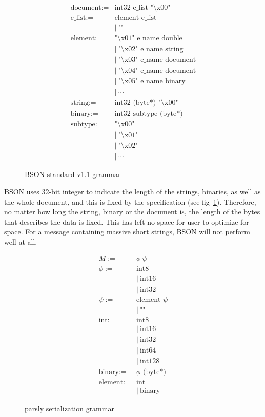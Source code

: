 \documentclass{article}
\begin{document}
\begin{figure}[h!]
\label{eq:bsonGrammar}
\begin{align*}
\text{document} :=&  \text{int32 e\_list "\textbackslash x00" } \\
\text{e\_list} :=& \text{element e\_list} \\
&| \ \text{""} \\
\text{element}	:=& \text{"\textbackslash x01" e\_name double} \\
&| \ \text{"\textbackslash x02" e\_name string} \\
&| \ \text{"\textbackslash x03" e\_name document} \\
&| \ \text{"\textbackslash x04" e\_name document} \\
&| \ \text{"\textbackslash x05" e\_name binary} \\
&| \ \cdots \\
\text{string} :=& \text{int32 (byte*) "\textbackslash x00"} \\
\text{binary} :=& \text{int32 subtype (byte*)} \\
\text{subtype} :=& \text{"\textbackslash x00"} \\
&| \ \text{"\textbackslash x01"} \\
&| \ \text{"\textbackslash x02"} \\
&| \ \cdots 
\end{align*}
\caption{BSON standard v1.1 grammar}
\end{figure}

BSON uses 32-bit integer to indicate the length of the strings, binaries, as well as the whole document, and this is fixed by the specification (see fig~\ref{eq:bsonGrammar}). Therefore, no matter how long the string, binary or the document is, the length of the bytes that describes the data is fixed. This has left no space for user to optimize for space. For a message containing massive short strings, BSON will not perform well at all. 

\begin{figure}[h!]
\label{eq:parslyGrammar}
\begin{align*}
M :=& \phi \ \psi \\
\phi :=& \text{int8} \\
&| \ \text{int16} \\
&| \ \text{int32} \\
\psi :=& \text{element } \psi \\
&| \ \text{""} \\
\text{int} :=& \text{int8} \\
&| \ \text{int16} \\
&| \ \text{int32} \\
&| \ \text{int64} \\
&| \ \text{int128} \\
\text{binary} :=& \phi  \text{ (byte*)} \\
\text{element}	:=& \text{int} \\
&| \ \text{binary} 
\end{align*}
\caption{parsly serialization grammar}
\end{figure}
\end{document}
